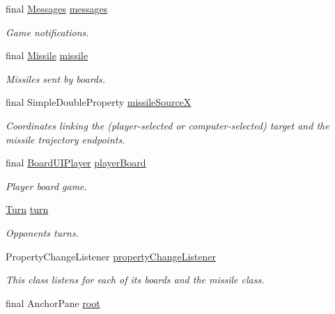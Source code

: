 \begin{DoxyCompactItemize}
final \hyperlink{classbattleship2D_1_1ui_1_1Messages}{Messages} \hyperlink{classbattleship2D_1_1ui_1_1MainFrame_abc1c8957486a32014fae369c0132e5e4}{messages}
\begin{DoxyCompactList}\small\item\em Game notifications. \end{DoxyCompactList}\item 
final \hyperlink{classbattleship2D_1_1ui_1_1Missile}{Missile} \hyperlink{classbattleship2D_1_1ui_1_1MainFrame_aecfa71650afad9e252e9920a52c0919d}{missile}
\begin{DoxyCompactList}\small\item\em Missiles sent by boards. \end{DoxyCompactList}\item 
final Simple\-Double\-Property \hyperlink{classbattleship2D_1_1ui_1_1MainFrame_afe5bf635e71814fb5386b25a226b4507}{missile\-Source\-X}
\begin{DoxyCompactList}\small\item\em Coordinates linking the (player-\/selected or computer-\/selected) target and the missile trajectory endpoints. \end{DoxyCompactList}\item 
final \hyperlink{classbattleship2D_1_1ui_1_1BoardUIPlayer}{Board\-U\-I\-Player} \hyperlink{classbattleship2D_1_1ui_1_1MainFrame_a622caa40f99d1bffb03cf44abf5ee6a0}{player\-Board}
\begin{DoxyCompactList}\small\item\em Player board game. \end{DoxyCompactList}\item 
\hyperlink{enumbattleship2D_1_1model_1_1Turn}{Turn} \hyperlink{classbattleship2D_1_1ui_1_1MainFrame_a7bd357e0fef24dee7bf1fd97cf199b81}{turn}
\begin{DoxyCompactList}\small\item\em Opponents turns. \end{DoxyCompactList}\item 
Property\-Change\-Listener \hyperlink{classbattleship2D_1_1ui_1_1MainFrame_ac489e5eaa547a158355bcca48e1946ca}{property\-Change\-Listener}
\begin{DoxyCompactList}\small\item\em This class listens for each of its boards and the missile class. \end{DoxyCompactList}\item 
final Anchor\-Pane \hyperlink{classbattleship2D_1_1ui_1_1MainFrame_aae9a45c1d1839f003199eb9ea4c08af6}{root}

\end{DoxyCompactItemize}
